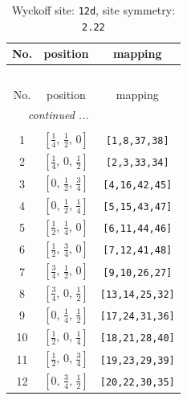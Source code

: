 \documentclass[fleqn,8pt]{jsarticle}
\begin{document}
\begin{longtable}{ccc}
\caption{Wyckoff site: {\tt 12d}, site symmetry: {\tt 2.22}}
 \\
 \hline \hline
No. & position & mapping \\ \hline \endfirsthead

\multicolumn{2}{l}{\tablename\ \thetable{}} \\
 \hline \hline
No. & position & mapping \\ \hline \endhead

 \hline \hline
\multicolumn{2}{r}{\footnotesize\it continued ...} \\ \endfoot

 \hline \hline
\multicolumn{2}{r}{} \\ \endlastfoot

1 & $\left[ \frac{1}{4},\, \frac{1}{2},\, 0 \right]$ & {\tt [1,8,37,38]} \\ \hline
2 & $\left[ \frac{1}{4},\, 0,\, \frac{1}{2} \right]$ & {\tt [2,3,33,34]} \\ \hline
3 & $\left[ 0,\, \frac{1}{2},\, \frac{3}{4} \right]$ & {\tt [4,16,42,45]} \\ \hline
4 & $\left[ 0,\, \frac{1}{2},\, \frac{1}{4} \right]$ & {\tt [5,15,43,47]} \\ \hline
5 & $\left[ \frac{1}{2},\, \frac{1}{4},\, 0 \right]$ & {\tt [6,11,44,46]} \\ \hline
6 & $\left[ \frac{1}{2},\, \frac{3}{4},\, 0 \right]$ & {\tt [7,12,41,48]} \\ \hline
7 & $\left[ \frac{3}{4},\, \frac{1}{2},\, 0 \right]$ & {\tt [9,10,26,27]} \\ \hline
8 & $\left[ \frac{3}{4},\, 0,\, \frac{1}{2} \right]$ & {\tt [13,14,25,32]} \\ \hline
9 & $\left[ 0,\, \frac{1}{4},\, \frac{1}{2} \right]$ & {\tt [17,24,31,36]} \\ \hline
10 & $\left[ \frac{1}{2},\, 0,\, \frac{1}{4} \right]$ & {\tt [18,21,28,40]} \\ \hline
11 & $\left[ \frac{1}{2},\, 0,\, \frac{3}{4} \right]$ & {\tt [19,23,29,39]} \\ \hline
12 & $\left[ 0,\, \frac{3}{4},\, \frac{1}{2} \right]$ & {\tt [20,22,30,35]} \\
\end{longtable}
\renewcommand{\arraystretch}{1.2}
\end{document}

